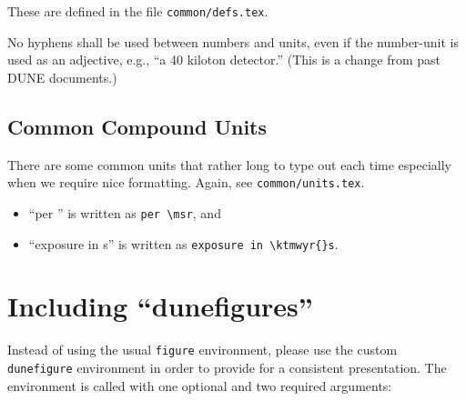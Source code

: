 These are defined in the file \texttt{common/defs.tex}.

No hyphens shall be used between numbers and units, even if the number-unit is used as an adjective, e.g., ``a 40 kiloton detector.''  (This is a change from past DUNE documents.) 


\subsection{Common Compound Units}

There are some common units that rather long to type out each time
especially when we require nice formatting. Again, see \texttt{common/units.tex}.

\begin{itemize}
\item ``per \msr'' is written as \verb|per \msr|, and
\item ``exposure in \ktmwyr{}s'' is written as \verb|exposure in \ktmwyr{}s|.
\end{itemize}


\section{Including ``dunefigures''}
\label{sec:latex-figures}

Instead of using the usual \texttt{figure} environment, please use the custom \texttt{dunefigure}
environment in order to provide for a consistent presentation.
The environment is called with one optional and two required
arguments:

